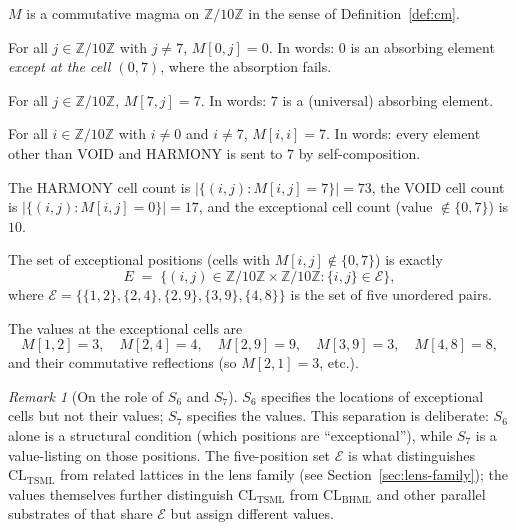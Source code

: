 \documentclass[11pt,reqno]{amsart}
\theoremstyle{plain}
\theoremstyle{definition}
\theoremstyle{remark}
\newtheorem*{remark}{Remark}
\newcommand{\Z}{\mathbb{Z}}
\newcommand{\TSML}{\mathrm{TSML}}
\newcommand{\BHML}{\mathrm{BHML}}
\newcommand{\CL}{\mathrm{CL}}
\begin{document}
\begin{description}
\setlength\itemsep{4pt}

\item[$S_{1}$ (Substrate type).] $M$ is a commutative magma on
$\Z/10\Z$ in the sense of Definition~\ref{def:cm}.

\item[$S_{2}$ (Near-absorption with puncture at $V = 0$).]
For all $j \in \Z/10\Z$ with $j \neq 7$, $M[0, j] = 0$. In words:
$0$ is an absorbing element \emph{except at the cell $(0, 7)$}, where
the absorption fails.

\item[$S_{3}$ (Absorption at $H = 7$).] For all $j \in \Z/10\Z$,
$M[7, j] = 7$. In words: $7$ is a (universal) absorbing element.

\item[$S_{4}$ (Idempotence outside $\{V, H\}$).] For all
$i \in \Z/10\Z$ with $i \neq 0$ and $i \neq 7$, $M[i, i] = 7$. In
words: every element other than VOID and HARMONY is sent to $7$ by
self-composition.

\item[$S_{5}$ (Cell-count constraint).] The HARMONY cell count is
$|\{(i, j) : M[i, j] = 7\}| = 73$, the VOID cell count is
$|\{(i, j) : M[i, j] = 0\}| = 17$, and the exceptional cell count
(value $\notin \{0, 7\}$) is $10$.

\item[$S_{6}$ (Exceptional positions).] The set of exceptional
positions (cells with $M[i, j] \notin \{0, 7\}$) is exactly
\[
E \;=\; \{(i, j) \in \Z/10\Z \times \Z/10\Z : \{i, j\} \in
\mathcal{E}\},
\]
where $\mathcal{E} = \{\{1, 2\}, \{2, 4\}, \{2, 9\}, \{3, 9\},
\{4, 8\}\}$ is the set of five unordered pairs.

\item[$S_{7}$ (Exceptional values).] The values at the exceptional
cells are
\[
M[1, 2] = 3, \quad M[2, 4] = 4, \quad M[2, 9] = 9,
\quad M[3, 9] = 3, \quad M[4, 8] = 8,
\]
and their commutative reflections (so $M[2, 1] = 3$, etc.).

\end{description}

\begin{remark}[On the role of $S_{6}$ and $S_{7}$]
$S_{6}$ specifies the locations of exceptional cells but not their
values; $S_{7}$ specifies the values. This separation is deliberate:
$S_{6}$ alone is a structural condition (which positions are
``exceptional''), while $S_{7}$ is a value-listing on those positions.
The five-position set $\mathcal{E}$ is what distinguishes
$\CL_{\TSML}$ from related lattices in the lens family (see
Section~\ref{sec:lens-family}); the values themselves further
distinguish $\CL_{\TSML}$ from $\CL_{\BHML}$ and other parallel
substrates of \cite{SandersGishFourCore} that share $\mathcal{E}$ but
assign different values.
\end{remark}
\end{document}
